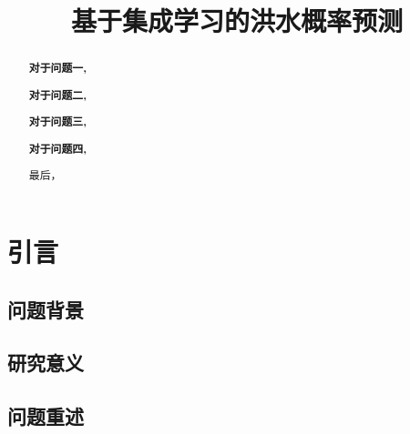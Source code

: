 \documentclass[withoutpreface,bwprint]{cumcmthesis}
\title{基于集成学习的洪水概率预测}  %
\begin{document}
	
\maketitle
\begin{abstract}


\textbf{对于问题一,}

\textbf{对于问题二,}

\textbf{对于问题三,}

\textbf{对于问题四,}

最后，




\end{abstract}













\vspace{-1.4cm} 
\section{引言}
\subsection{问题背景}







\subsection{研究意义}












\subsection{问题重述}
\end{document}
